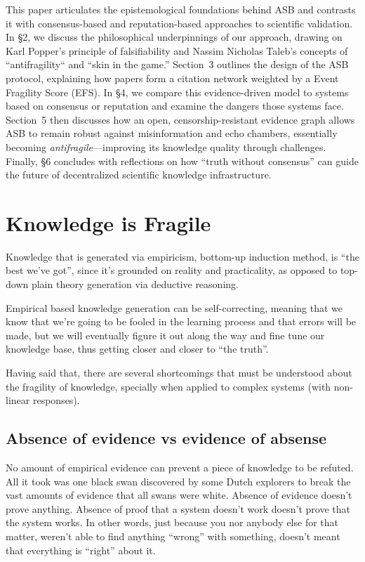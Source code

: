 \documentclass{article}
\begin{document}
This paper articulates the epistemological foundations behind ASB and contrasts it with consensus-based and reputation-based approaches to scientific validation. In \S2, we discuss the philosophical underpinnings of our approach, drawing on Karl Popper's principle of falsifiability and Nassim Nicholas Taleb's concepts of ``antifragility`` and ``skin in the game.'' Section~3 outlines the design of the ASB protocol, explaining how papers form a citation network weighted by a Event Fragility Score (EFS). In \S4, we compare this evidence-driven model to systems based on consensus or reputation and examine the dangers those systems face. Section~5 then discusses how an open, censorship-resistant evidence graph allows ASB to remain robust against misinformation and echo chambers, essentially becoming \emph{antifragile}---improving its knowledge quality through challenges. Finally, \S6 concludes with reflections on how ``truth without consensus'' can guide the future of decentralized scientific knowledge infrastructure.

\section{Knowledge is Fragile}

Knowledge that is generated via empiricism, bottom-up induction method, is ``the best we've got'', since it's grounded on reality and practicality, as opposed to top-down plain theory generation via deductive reasoning.

Empirical based knowledge generation can be self-correcting, meaning that we know that we're going to be fooled in the learning process and that errors will be made, but we will eventually figure it out along the way and fine tune our knowledge base, thus getting closer and closer to ``the truth''.

Having said that, there are several shortcomings that must be understood about the fragility of knowledge, specially when applied to complex systems (with non-linear responses).

\subsection{Absence of evidence vs evidence of absense}
No amount of empirical evidence can prevent a piece of knowledge to be refuted. All it took was one black swan discovered by some Dutch explorers to break the vast amounts of evidence that all swans were white. Absence of evidence doesn't prove anything. Absence of proof that a system doesn't work doesn't prove that the system works. In other words, just because you nor anybody else for that matter, weren't able to find anything ``wrong'' with something, doesn't meant that everything is ``right'' about it.
\end{document}
